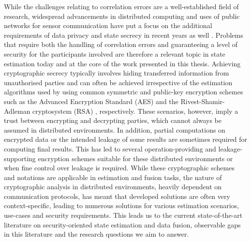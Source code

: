 While the challenges relating to correlation errors are a well-established field of research, widespread advancements in distributed computing and uses of public networks for sensor communication have put a focus on the additional requirements of data privacy and state secrecy in recent years as well \cite{brennerSecretProgramExecution2011,renSecurityChallengesPublic2012}. Problems that require both the handling of correlation errors and guaranteeing a level of security for the participants involved are therefore a relevant topic in state estimation today and at the core of the work presented in this thesis. Achieving cryptographic secrecy typically involves hiding transferred information from unauthorised parties and can often be achieved irrespective of the estimation algorithms used by using common symmetric and public-key encryption schemes such as the Advanced Encryption Standard (AES) \cite{gueronIntelAdvancedEncryption2010} and the Rivest-Shamir-Adleman cryptosystem (RSA) \cite{rivestMethodObtainingDigital1978}, respectively. These scenarios, however, imply a trust between encrypting and decrypting parties, which cannot always be assumed in distributed environments. In addition, partial computations on encrypted data or the intended leakage of some results are sometimes required for computing final results. This has led to several operation-providing and leakage-supporting encryption schemes \cite{paillierPublicKeyCryptosystemsBased1999,shiPrivacyPreservingAggregationTimeSeries2011,joyeScalableSchemePrivacyPreserving2013,chotardDecentralizedMultiClientFunctional2018,andresGeoIndistinguishabilityDifferentialPrivacy2013} suitable for these distributed environments or when fine control over leakage is required. While these cryptographic schemes and notations are applicable in estimation and fusion tasks, the nature of cryptographic analysis in distributed environments, heavily dependent on communication protocols, has meant that developed solutions are often very context-specific, leading to numerous solutions for various estimation scenarios, use-cases and security requirements. This leads us to the current state-of-the-art literature on security-oriented state estimation and data fusion, observable gaps in this literature and the research questions we aim to answer.


% 
%                                             
%                                             
%                                             
% 

